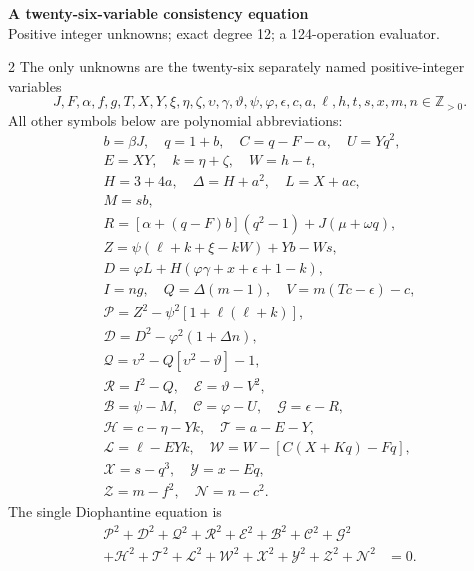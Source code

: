 \documentclass[10pt]{article}
\begin{document}
\begin{center}
{\large\bfseries A twenty-six-variable consistency equation}\\[-1pt]
{\small Positive integer unknowns; exact degree 12; a 124-operation evaluator.}
\end{center}\vspace{-8pt}
\begin{multicols}{2}
\fontsize{8.6}{9.1}\selectfont
The only unknowns are the twenty-six separately named positive-integer variables
\[
J,F,\alpha,f,g,T,X,Y,\xi,\eta,\zeta,\upsilon,\gamma,\vartheta,\psi,\varphi,\epsilon,c,a,\ell,h,t,s,x,m,n\in\mathbb Z_{>0}.
\]
All other symbols below are polynomial abbreviations:
\[
\begin{gathered}
b=\beta J,\quad q=1+b,\quad C=q-F-\alpha,\quad U=Yq^2,\\
E=XY,\quad k=\eta+\zeta,\quad W=h-t,\\
H=3+4a,\quad\Delta=H+a^2,\quad L=X+ac,\\
M=sb,\\
R=[\alpha+(q-F)b](q^2-1)+J(\mu+\omega q),\\
Z=\psi(\ell+k+\xi-kW)+Yb-Ws,\\
D=\varphi L+H(\varphi\gamma+x+\epsilon+1-k),\\
I=ng,\quad Q=\Delta(m-1),\quad V=m(Tc-\epsilon)-c,\\
\mathcal{P}=Z^2-\psi^2[1+\ell(\ell+k)],\\
\mathcal{D}=D^2-\varphi^2(1+\Delta n),\\
\mathcal{Q}=\upsilon^2-Q[\upsilon^2-\vartheta]-1,\\
\mathcal{R}=I^2-Q,\quad \mathcal{E}=\vartheta-V^2,\\
\mathcal{B}=\psi-M,\quad \mathcal{C}=\varphi-U,\quad \mathcal{G}=\epsilon-R,\\
\mathcal{H}=c-\eta-Yk,\quad \mathcal{T}=a-E-Y,\\
\mathcal{L}=\ell-EYk,\quad \mathcal{W}=W-[C(X+Kq)-Fq],\\
\mathcal{X}=s-q^3,\quad \mathcal{Y}=x-Eq,\\
\mathcal{Z}=m-f^2,\quad \mathcal{N}=n-c^2.
\end{gathered}
\]
The single Diophantine equation is
\[
\begin{split}
\mathcal{P}^2+\mathcal{D}^2+\mathcal{Q}^2+\mathcal{R}^2+\mathcal{E}^2+\mathcal{B}^2+\mathcal{C}^2+\mathcal{G}^2 &\\
+\mathcal{H}^2+\mathcal{T}^2+\mathcal{L}^2+\mathcal{W}^2+\mathcal{X}^2+\mathcal{Y}^2+\mathcal{Z}^2+\mathcal{N}^2 &= 0.

\end{split}\]
\end{multicols}
\end{document}

